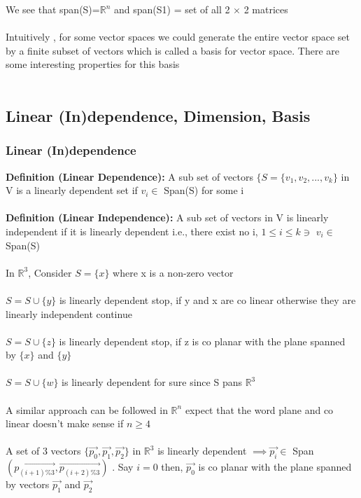 \documentclass{article}
\begin{document}
    We see that span(S)=$\mathbb{R}^n$ and span(S1) = set of all 2 $\times$ 2 matrices \\ \\
    Intuitively , for some vector spaces we could generate the entire vector space set by a finite subset of vectors which is called a basis for vector space. There are some interesting properties for this basis \\ \\
    \subsection{Linear (In)dependence, Dimension, Basis}
    \subsubsection{Linear (In)dependence}
    \textbf{Definition (Linear Dependence): } A sub set of vectors $\{S=\{v_1,v_2,...,v_k\}$ in V is a linearly dependent set if $v_i \in$ Span(S) for some i \\ \\
    \textbf{Definition (Linear Independence): } A sub set of vectors in V is linearly independent if it is linearly dependent i.e., there exist no i, $ 1 \leq i \leq k \ni $  
    $v_i \in$ Span(S) \\ \\
    In $\mathbb{R}^3$, Consider $S=\{x\}$ where x is a non-zero vector \\ \\
    $S = S \cup \{y\}$ is linearly dependent stop, if y and x are co linear otherwise they are linearly independent continue \\ \\
    $S = S \cup \{z\}$ is linearly dependent stop, if z is co planar with the plane spanned by $\{x\}$ and $\{y\}$ \\ \\
    $S = S \cup \{w\}$ is linearly dependent for sure since S pans $\mathbb{R}^3$ \\ \\
    A similar approach can be followed in $\mathbb{R}^n$ expect that the word plane and co linear doesn't make sense if $n \geq 4$ \\ \\
    A set of 3 vectors $\{ \Vec{p_0},\Vec{p_1},\Vec{p_2}\}$ in $\mathbb{R}^3$ is linearly dependent $\implies \Vec{p_i} \in$ Span $(\Vec{p_{(i+1)\%3}},\Vec{p_{(i+2)\%3}})$ . Say $i = 0$ then, $\Vec{p_0}$ is co planar with the plane spanned by vectors $\Vec{p_1}$ and $\Vec{p_2}$ \\ \\
\end{document}
